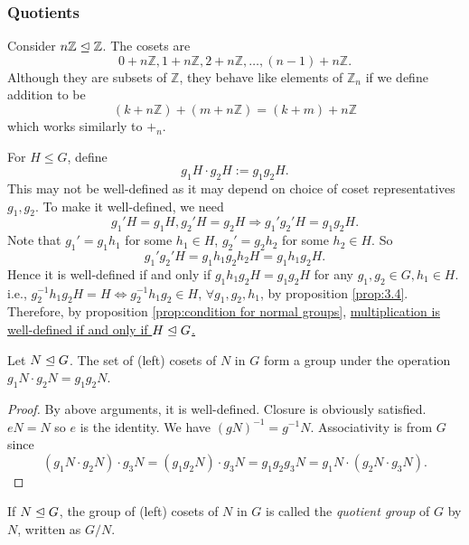 \documentclass[a4paper]{article}
\begin{document}
    \subsubsection{Quotients}
    Consider $ n \mathbb{Z} \trianglelefteq \mathbb{Z} $. The cosets are 
    \[
        0+n \mathbb{Z}, 1+n \mathbb{Z} , 2+n \mathbb{Z} , \dots, (n-1)+n \mathbb{Z} 
    .\]
    Although they are subsets of $ \mathbb{Z} $, they behave like elements of $ \mathbb{Z}_n $ if we define addition to be 
    \[
        (k+n \mathbb{Z} )+(m+n \mathbb{Z} )=(k+m)+n \mathbb{Z}
    \]
    which works similarly to $ +_n $.

    For $ H\le G $, define 
    \[
        g_1H\cdot g_2H:= g_1g_2H
    .\]
    This may not be well-defined as it may depend on choice of coset representatives $g_1,g_2$.
    To make it well-defined, we need 
    \[
        g_1'H=g_1H, g_2'H=g_2H \Longrightarrow g_1'g_2'H=g_1g_2H
    .\]
    Note that $ g_1'=g_1h_1 $ for some $h_1\in H$, $ g_2'=g_2h_2 $ for some $h_2\in H$. So 
    \[
        g_1'g_2'H=g_1h_1g_2h_2H=g_1h_1g_2H
    .\]
    Hence it is well-defined if and only if $  g_1h_1g_2H=g_1g_2H $ for any $ g_1,g_2\in G, h_1\in H $. i.e., $ g_2^{-1}h_1g_2H=H \Leftrightarrow g_2^{-1}h_1g_2\in H $, $ \forall g_1,g_2,h_1 $, by proposition \ref{prop:3.4}. Therefore, by proposition \ref{prop:condition for normal groups}, \underline{multiplication is well-defined if and only if $ H\trianglelefteq G $.}
    \begin{proposition}\label{prop:set of one-sided cosets form a group}
        Let $ N\trianglelefteq G $. The set of (left) cosets of $N$ in $G$ form a group under the operation $ g_1N\cdot g_2N=g_1g_2 N $.
    \end{proposition}
    \begin{proof}
        By above arguments, it is well-defined. Closure is obviously satisfied. $eN=N$ so $e$ is the identity. We have $ (gN)^{-1}=g^{-1}N $. Associativity is from $G$ since
        \[
            (g_1N\cdot g_2N)\cdot g_3N=(g_1g_2N)\cdot g_3N=g_1g_2g_3N=g_1N\cdot(g_2N\cdot g_3N)
        .\]
    \end{proof}
    \begin{definition}
        If $ N \trianglelefteq G $, the group of (left) cosets of $N$ in $G$ is called the \textit{quotient group} of $G$ by $N$, written as $ G/N $. 
    \end{definition}
\end{document}
